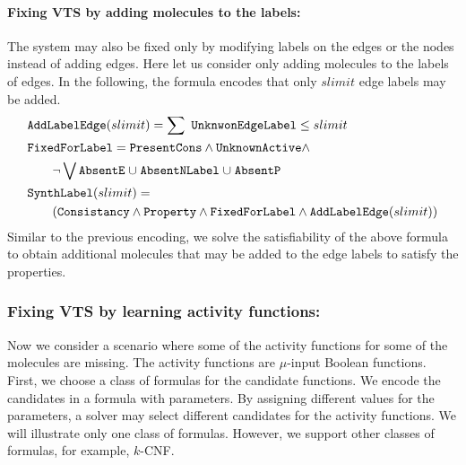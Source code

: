 \paragraph{\bf Fixing VTS by adding molecules to the labels:}
The system may also be fixed only by modifying labels on the edges or the nodes instead
of adding edges.
%
Here let us consider only adding molecules to the labels of edges.
%
In the following, the formula encodes that only $slimit$ edge labels may be added.
\begin{align*}
&\texttt{AddLabelEdge}(slimit) = 
\sum~\texttt{UnknwonEdgeLabel}  \leq slimit\\
& \texttt{FixedForLabel} = \texttt{PresentCons} \land \texttt{UnknownActive} \land\\
& \quad \quad \lnot \bigvee \texttt{AbsentE} \;{\cup}\;
\texttt{AbsentNLabel} \;{\cup}\;
\texttt{AbsentP}\\
&\texttt{SynthLabel}(slimit) = \\
& \quad\quad
(  \texttt{Consistancy}\land \texttt{Property} \land
\texttt{FixedForLabel} \land \texttt{AddLabelEdge}(slimit) )
\end{align*} 
Similar to the previous encoding, we solve the
satisfiability of the above formula to obtain additional molecules
that may be added to the edge labels to satisfy the properties.

\subsubsection{Fixing VTS by learning activity functions:}
Now we consider a scenario where some of the activity functions for
some of the molecules are missing.
%
The activity functions are $\mu$-input Boolean functions.
%
First, we choose a class of formulas for the candidate functions.
%
We encode the candidates in a formula with parameters.
%
By assigning different values for the parameters, a solver may select
different candidates for the activity functions.
%
We will illustrate only one class of formulas.
%
However, we support other classes of formulas, for example, $k$-CNF.


